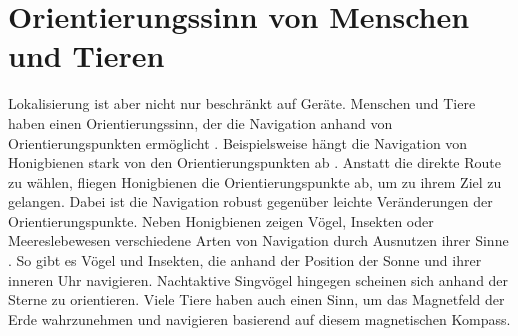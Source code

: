 \section{Orientierungssinn von Menschen und Tieren}
Lokalisierung ist aber nicht nur beschränkt auf Geräte.
Menschen und Tiere haben einen Orientierungssinn, der die Navigation anhand von Orientierungspunkten ermöglicht \cite{krukar2017landmark, menzel1996knowledge}.
Beispielsweise hängt die Navigation von Honigbienen stark von den Orientierungspunkten ab \cite{menzel1996knowledge}.
Anstatt die direkte Route zu wählen, fliegen Honigbienen die Orientierungspunkte ab, um zu ihrem Ziel zu gelangen.
Dabei ist die Navigation robust gegenüber leichte Veränderungen der Orientierungspunkte.
\newline
\newline
Neben Honigbienen zeigen Vögel, Insekten oder Meereslebewesen verschiedene Arten von Navigation durch Ausnutzen ihrer Sinne \cite{aakesson2014animal}.
So gibt es Vögel und Insekten, die anhand der Position der Sonne und ihrer inneren Uhr navigieren.
Nachtaktive Singvögel hingegen scheinen sich anhand der Sterne zu orientieren.
Viele Tiere haben auch einen Sinn, um das Magnetfeld der Erde wahrzunehmen und navigieren basierend auf diesem magnetischen Kompass.